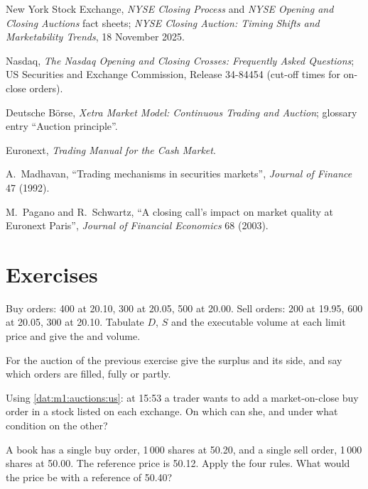 \begin{omsources}
\item New York Stock Exchange, \emph{NYSE Closing Process} and \emph{NYSE
Opening and Closing Auctions} fact sheets; \emph{NYSE Closing Auction: Timing
Shifts and Marketability Trends}, 18 November 2025.
\item Nasdaq, \emph{The Nasdaq Opening and Closing Crosses: Frequently Asked
Questions}; US Securities and Exchange Commission, Release 34-84454 (cut-off
times for on-close orders).
\item Deutsche Börse, \emph{Xetra Market Model: Continuous Trading and
Auction}; glossary entry ``Auction principle''.
\item Euronext, \emph{Trading Manual for the Cash Market}.
\item A.~Madhavan, ``Trading mechanisms in securities markets'',
\emph{Journal of Finance} 47 (1992).
\item M.~Pagano and R.~Schwartz, ``A closing call's impact on market
quality at Euronext Paris'', \emph{Journal of Financial Economics} 68
(2003).
\end{omsources}

\section{Exercises}

\begin{exercise}[$\star$]\label{exo:m1:auctions:1}
Buy orders: 400 at 20.10, 300 at 20.05, 500 at 20.00. Sell orders: 200 at
19.95, 600 at 20.05, 300 at 20.10. Tabulate $D$, $S$ and the executable
volume at each limit price and give the  and volume.
\end{exercise}

\begin{exercise}[$\star$]\label{exo:m1:auctions:2}
For the auction of the previous exercise give the surplus and its side, and
say which orders are filled, fully or partly.
\end{exercise}

\begin{exercise}[$\star$]\label{exo:m1:auctions:3}
Using \cref{dat:m1:auctions:us}: at 15:53 a trader wants to add a
market-on-close buy order in a stock listed on each exchange. On which can
she, and under what condition on the other?
\end{exercise}

\begin{exercise}[$\star\star$]\label{exo:m1:auctions:4}
A book has a single buy order, 1\,000 shares at 50.20, and a single sell
order, 1\,000 shares at 50.00. The reference price is 50.12. Apply the four
rules. What would the price be with a reference of 50.40?
\end{exercise}

